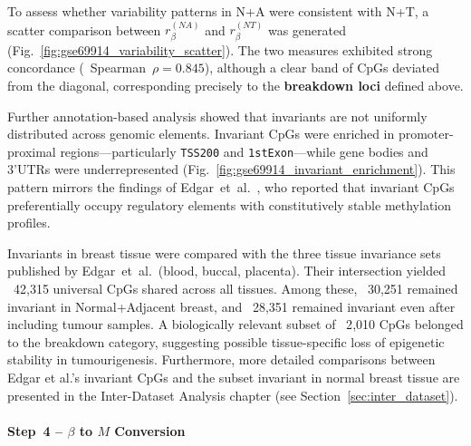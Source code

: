 \documentclass[10pt]{extarticle}
\newcommand{\good}[1]{\textcolor{teal!70!black}{\ding{51}~#1}}
\begin{document}
To assess whether variability patterns in N+A were consistent with N+T, a
scatter comparison between \(r_\beta^{(NA)}\) and \(r_\beta^{(NT)}\) was
generated (Fig.~\ref{fig:gse69914_variability_scatter}).  
The two measures exhibited strong concordance
(\good{Spearman~\(\rho = 0.845\)}), although a clear band of CpGs deviated
from the diagonal, corresponding precisely to the \textbf{breakdown loci}
defined above.

Further annotation-based analysis showed that invariants are not uniformly
distributed across genomic elements.
Invariant CpGs were enriched in promoter-proximal regions—particularly
\texttt{TSS200} and \texttt{1stExon}—while gene bodies and 3'UTRs were
underrepresented (Fig.~\ref{fig:gse69914_invariant_enrichment}).
This pattern mirrors the findings of Edgar~et~al.~\cite{Edgar2017}, who
reported that invariant CpGs preferentially occupy regulatory elements with
constitutively stable methylation profiles.

Invariants in breast tissue were compared with the three tissue
invariance sets published by Edgar~et~al.\ (blood, buccal, placenta).
Their intersection yielded \good{42{,}315 universal CpGs} shared across all tissues.
Among these, \good{30{,}251} remained invariant in Normal+Adjacent breast, and \good{28{,}351} remained invariant even after including tumour samples.
A biologically relevant subset of \good{2{,}010 CpGs} belonged to the breakdown category, suggesting possible tissue-specific loss of epigenetic stability in tumourigenesis.
Furthermore, more detailed comparisons between Edgar et al.’s invariant CpGs and the subset invariant in normal breast tissue are presented in the Inter-Dataset Analysis chapter (see Section~\ref{sec:inter_dataset}). 

\paragraph{Step~4 -- $\beta$ to $M$ Conversion}
\label{par:gse69914_step4}
\end{document}
